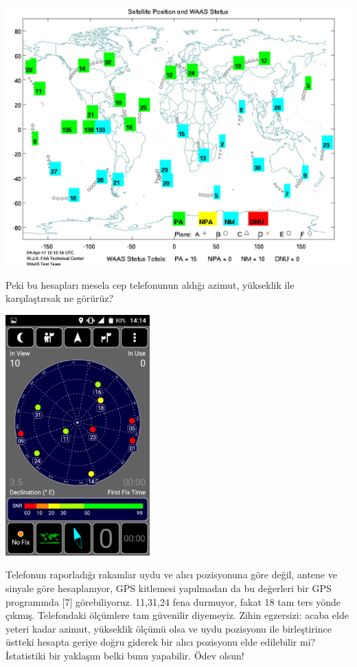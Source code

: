 \documentclass[12pt,fleqn]{article}\usepackage{../../common}
\begin{document}
\includegraphics[width=40em]{waas_sats.png}

Peki bu hesapları mesela cep telefonunun aldığı azimut, yükseklik ile
karşılaştırsak ne görürüz? 

\includegraphics[width=15em]{gpstest.png}

Telefonun raporladığı rakamlar uydu ve alıcı pozisyonuna göre değil, antene
ve sinyale göre hesaplanıyor, GPS kitlemesi yapılmadan da bu değerleri bir
GPS programında [7] görebiliyoruz. 11,31,24 fena durmuyor, fakat 18 tam
ters yönde çıkmış. Telefondaki ölçümlere tam güvenilir diyemeyiz. Zihin
egzersizi: acaba elde yeteri kadar azimut, yükseklik ölçümü olsa ve uydu
pozisyonu ile birleştirince üstteki hesapta geriye doğru giderek bir alıcı
pozisyonu elde edilebilir mi? İstatistiki bir yaklaşım belki bunu
yapabilir. Ödev olsun!
\end{document}
